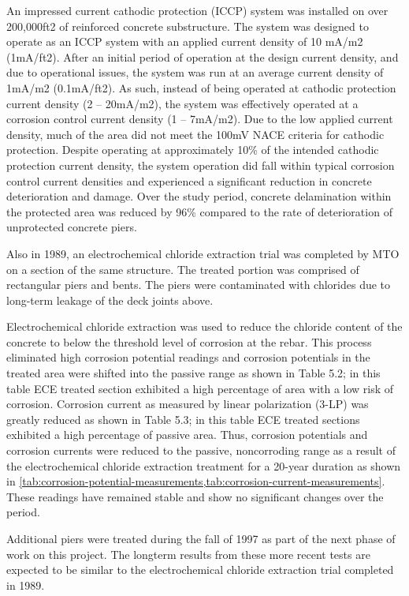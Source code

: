 An impressed current cathodic protection (ICCP) system was installed on over 200,000ft2 of reinforced concrete substructure. The system was designed to operate as an ICCP system with an applied current density of 10 mA/m2 (1mA/ft2). After an initial period of operation at the design current density, and due to operational issues, the system was run at an average current density of 1mA/m2 (0.1mA/ft2). As such, instead of being operated at cathodic protection current density (2 – 20mA/m2), the system was effectively operated at a corrosion control current density (1 – 7mA/m2). Due to the low applied current density, much of the area did not meet the 100mV NACE criteria for cathodic protection. Despite operating at approximately 10\% of the intended cathodic protection current density, the system operation did fall within typical corrosion control current densities and experienced a significant reduction in concrete deterioration and damage. Over the study period, concrete delamination within the protected area was reduced by 96\% compared to the rate of deterioration of unprotected concrete piers.

Also in 1989, an electrochemical chloride extraction trial was completed by MTO on a section of the same structure. The treated portion was comprised of rectangular piers and bents. The piers were contaminated with chlorides due to long-term leakage of the deck joints above.

Electrochemical chloride extraction was used to reduce the chloride content of the concrete to below the threshold level of corrosion at the rebar. This process eliminated high corrosion potential readings and corrosion potentials in the treated area were shifted into the passive range as shown in Table 5.2; in this table ECE treated section exhibited a high percentage of area with a low risk of corrosion. Corrosion current as measured by linear polarization (3-LP) was greatly reduced as shown in Table 5.3; in this table ECE treated sections exhibited a high percentage of passive area. Thus, corrosion potentials and corrosion currents were reduced to the passive, noncorroding range as a result of the electrochemical chloride extraction treatment for a 20-year duration as shown in \cref{tab:corrosion-potential-measurements,tab:corrosion-current-measurements}. These readings have remained stable and show no significant changes over the period.

Additional piers were treated during the fall of 1997 as part of the next phase of work on this project. The longterm results from these more recent tests are expected to be similar to the electrochemical chloride extraction trial completed in 1989.

